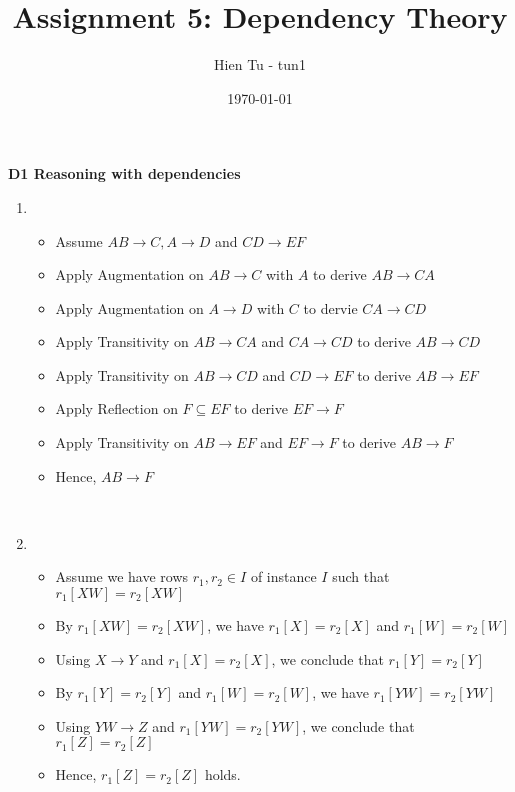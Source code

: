 \documentclass{article}
\title{Assignment 5: Dependency Theory}
\author{Hien Tu - tun1}
\date{\today}
\begin{document}
\maketitle

\textbf{D1 Reasoning with dependencies}

\begin{enumerate}
  \item
    \begin{itemize}
      \item Assume $AB \longrightarrow C, A \longrightarrow D$ and $CD
            \longrightarrow EF$
      \item Apply Augmentation on $AB \longrightarrow C$ with $A$ to derive $AB
            \longrightarrow CA$
      \item Apply Augmentation on $A \longrightarrow D$ with $C$ to dervie $CA
            \longrightarrow CD$
      \item Apply Transitivity on $AB \longrightarrow CA$ and $CA
            \longrightarrow CD$ to derive $AB \longrightarrow CD$
      \item Apply Transitivity on $AB \longrightarrow CD$ and $CD
            \longrightarrow EF$ to derive $AB \longrightarrow EF$
      \item Apply Reflection on $F \subseteq EF$ to derive $EF \longrightarrow
            F$
      \item Apply Transitivity on $AB \longrightarrow EF$ and $EF
            \longrightarrow F$ to derive $AB \longrightarrow F$
      \item Hence, $AB \longrightarrow F$
    \end{itemize}
    \ \\

  \item
    \begin{itemize}
      \item Assume we have rows $r_1, r_2 \in I$ of instance $I$ such that
            $r_1[XW] = r_2[XW]$
      \item By $r_1[XW] = r_2[XW]$, we have $r_1[X] = r_2[X]$ and $r_1[W] =
            r_2[W]$
      \item Using $X \longrightarrow Y$ and $r_1[X] = r_2[X]$, we conclude that
            $r_1[Y] = r_2[Y]$
      \item By $r_1[Y] = r_2[Y]$ and $r_1[W] = r_2[W]$, we have $r_1[YW] =
            r_2[YW]$
      \item Using $YW \longrightarrow Z$ and $r_1[YW] = r_2[YW]$, we conclude
            that $r_1[Z] = r_2[Z]$
      \item Hence, $r_1[Z] = r_2[Z]$ holds.
    \end{itemize}


\end{enumerate}
\end{document}

